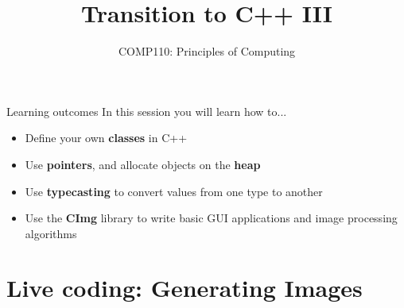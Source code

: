 \documentclass[xcolor={dvipsnames}]{beamer}\usepackage{etoolbox}\newtoggle{printable}\togglefalse{printable}
\begin{document}
\title{Transition to C++ III}   
\subtitle{COMP110: Principles of Computing}

\frame{\titlepage} 

\begin{frame}{Learning outcomes}
    In this session you will learn how to...
    \begin{itemize}
        \item Define your own \textbf{classes} in C++
        \item Use \textbf{pointers}, and allocate objects on the \textbf{heap}
        \item Use \textbf{typecasting} to convert values from one type to another
        \item Use the \textbf{CImg} library to write basic GUI applications and image processing algorithms
    \end{itemize}
\end{frame}


%
%
%

\part{Live coding: Generating Images}
\frame{\partpage}


%
\end{document}
